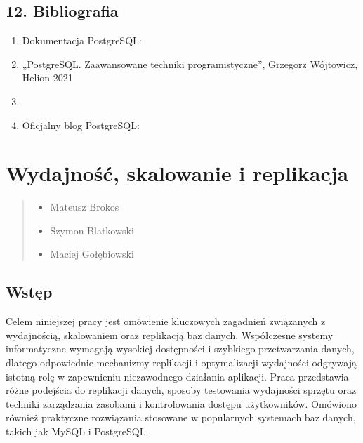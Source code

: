 \documentclass[a4paper,11pt,polish]{sphinxmanual}
\begin{document}
\section{12. Bibliografia}
\label{\detokenize{rozdzial_1:bibliografia}}\begin{enumerate}
%
\item {} 
\sphinxAtStartPar
Dokumentacja PostgreSQL: 

\item {} 
\sphinxAtStartPar
„PostgreSQL. Zaawansowane techniki programistyczne”, Grzegorz Wójtowicz, Helion 2021

\item {} 
\sphinxAtStartPar
{}

\item {} 
\sphinxAtStartPar
Oficjalny blog PostgreSQL: 

\end{enumerate}

\sphinxstepscope


\chapter{Wydajność, skalowanie i replikacja}
\label{\detokenize{Wydajnosc-Skalowanie-i-Replikacja/index:wydajnosc-skalowanie-i-replikacja}}\label{\detokenize{Wydajnosc-Skalowanie-i-Replikacja/index::doc}}\begin{quote}\begin{description}
\begin{itemize}
\item {} 
\sphinxAtStartPar
Mateusz Brokos

\item {} 
\sphinxAtStartPar
Szymon Blatkowski

\item {} 
\sphinxAtStartPar
Maciej Gołębiowski

\end{itemize}

\end{description}\end{quote}


\section{Wstęp}
\label{\detokenize{Wydajnosc-Skalowanie-i-Replikacja/index:wstep}}
\sphinxAtStartPar
Celem niniejszej pracy jest omówienie kluczowych zagadnień związanych z wydajnością, skalowaniem oraz replikacją baz danych. Współczesne systemy informatyczne wymagają wysokiej dostępności i szybkiego przetwarzania danych, dlatego odpowiednie mechanizmy replikacji i optymalizacji wydajności odgrywają istotną rolę w zapewnieniu niezawodnego działania aplikacji. Praca przedstawia różne podejścia do replikacji danych, sposoby testowania wydajności sprzętu oraz techniki zarządzania zasobami i kontrolowania dostępu użytkowników. Omówiono również praktyczne rozwiązania stosowane w popularnych systemach baz danych, takich jak MySQL i PostgreSQL.
\end{document}
